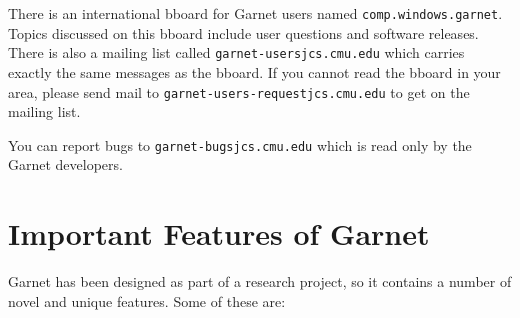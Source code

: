 \documentclass{report}
\begin{document}
There is an international bboard for Garnet users named
\texttt{comp.windows.garnet}.  Topics discussed on this bboard include
user questions and software releases.  There is also a mailing list
called \texttt{garnet-usersjcs.cmu.edu} which carries exactly the same
messages as the bboard.  If you cannot read the bboard in your area,
please send mail to \texttt{garnet-users-requestjcs.cmu.edu} to get on the
mailing list.

You can report bugs to \texttt{garnet-bugsjcs.cmu.edu} which is read only
by the Garnet developers.



\section{Important Features of Garnet}
 Garnet has been designed as part of a research
project, so it contains a number of novel and unique features.  Some
of these are:
\end{document}
